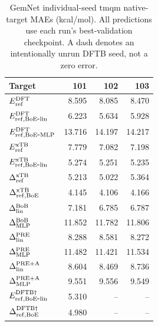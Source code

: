 \begin{table}[H]
\centering
\scriptsize
\setlength{\tabcolsep}{4pt}
\renewcommand{\arraystretch}{1.35}
\caption{GemNet individual-seed tmqm native-target MAEs (kcal/mol). All predictions use each run's best-validation checkpoint. A dash denotes an intentionally unrun DFTB seed, not a zero error.}
\begin{tabular}{lrrr}
\toprule
Target & 101 & 102 & 103 \\
\midrule
\(E_{\rm ref}^{\rm DFT}\) & 8.595 & 8.085 & 8.470 \\
\(E_{\rm ref,BoE\mbox{-}lin}^{\rm DFT}\) & 6.223 & 5.634 & 5.928 \\
\(E_{\rm ref,BoE\mbox{-}MLP}^{\rm DFT}\) & 13.716 & 14.197 & 14.217 \\
\(E_{\rm ref}^{\rm xTB}\) & 7.779 & 7.082 & 7.198 \\
\(E_{\rm ref,BoE\mbox{-}lin}^{\rm xTB}\) & 5.274 & 5.251 & 5.235 \\
\(\Delta^{\rm xTB}_{\rm ref}\) & 5.213 & 5.022 & 5.364 \\
\(\Delta^{\rm xTB}_{\rm ref,BoE}\) & 4.145 & 4.106 & 4.166 \\
\(\Delta^{\rm BoB}_{\rm lin}\) & 7.181 & 6.785 & 6.787 \\
\(\Delta^{\rm BoB}_{\rm MLP}\) & 11.852 & 11.782 & 11.806 \\
\(\Delta^{\rm PRE}_{\rm lin}\) & 8.288 & 8.581 & 8.272 \\
\(\Delta^{\rm PRE}_{\rm MLP}\) & 11.482 & 11.421 & 11.534 \\
\(\Delta^{\rm PRE+A}_{\rm lin}\) & 8.604 & 8.469 & 8.736 \\
\(\Delta^{\rm PRE+A}_{\rm MLP}\) & 9.551 & 9.556 & 9.549 \\
\(E_{\rm ref,BoE\mbox{-}lin}^{\rm DFTB\dagger}\) & 5.310 & -- & -- \\
\(\Delta^{\rm DFTB\dagger}_{\rm ref,BoE}\) & 4.980 & -- & -- \\
\bottomrule
\end{tabular}
\end{table}
